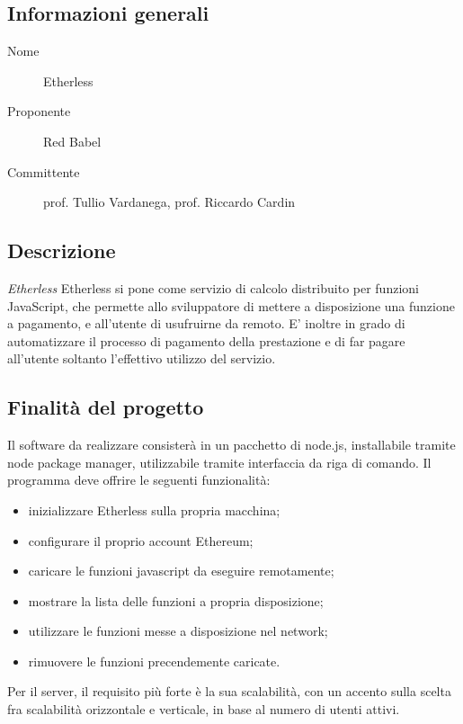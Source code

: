 \documentclass[../studio-di-fattibilita.tex]{subfiles}
\begin{document}
	\subsection{Informazioni generali}
	\label{subsec:informazioni_generali}
	\begin{description}
		\item[Nome] Etherless
		\item[Proponente] Red Babel
		\item[Committente] prof. Tullio Vardanega, prof. Riccardo Cardin
	\end{description}
	\subsection{Descrizione}
	\label{subsec:descrizione}
	\textit{Etherless} Etherless si pone come servizio di calcolo distribuito per funzioni JavaScript, che permette allo sviluppatore di mettere a disposizione una funzione 
a pagamento, e all'utente di usufruirne da remoto.
E' inoltre in grado di automatizzare il processo di pagamento della prestazione
e di far pagare all'utente soltanto l'effettivo utilizzo del servizio.
	\subsection{Finalità del progetto}
	\label{subsec:finalità_del_progetto}
	Il software da realizzare consisterà in un pacchetto di node.js, installabile tramite node package manager, utilizzabile tramite interfaccia da riga di comando.
Il programma deve offrire le seguenti funzionalità:
	\begin{itemize}
		\item inizializzare Etherless sulla propria macchina;
		\item configurare il proprio account Ethereum;
		\item caricare le funzioni javascript da eseguire remotamente;
		\item mostrare la lista delle funzioni a propria disposizione;
		\item utilizzare le funzioni messe a disposizione nel network;
		\item rimuovere le funzioni precendemente caricate.
	\end{itemize}
	Per il server, il requisito più forte è la sua scalabilità, con un accento sulla scelta fra scalabilità orizzontale e verticale, in base al numero di utenti attivi.
\end{document}
